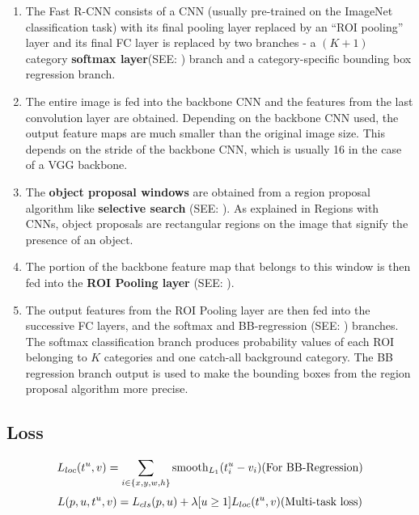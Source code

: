 \begin{enumerate}
    \item The Fast R-CNN consists of a CNN (usually pre-trained on the ImageNet classification task) with its final pooling layer replaced by an “ROI pooling” layer and its final FC layer is replaced by two branches - a $(K + 1)$ category \textbf{softmax layer}(SEE: ) branch and a category-specific bounding box regression branch.

    \item The entire image is fed into the backbone CNN and the features from the last convolution layer are obtained. Depending on the backbone CNN used, the output feature maps are much smaller than the original image size. This depends on the stride of the backbone CNN, which is usually 16 in the case of a VGG backbone.

    \item The \textbf{object proposal windows} are obtained from a region proposal algorithm like \textbf{selective search} (SEE: ). As explained in Regions with CNNs, object proposals are rectangular regions on the image that signify the presence of an object.

    \item The portion of the backbone feature map that belongs to this window is then fed into the \textbf{ROI Pooling layer} (SEE: ).

    \item The output features from the ROI Pooling layer are then fed into the successive FC layers, and the softmax and BB-regression (SEE: ) branches. The softmax classification branch produces probability values of each ROI belonging to $K$ categories and one catch-all background category. The BB regression branch output is used to make the bounding boxes from the region proposal algorithm more precise.
\end{enumerate}

\subsection*{Loss}
\[
    \displaystyle
    L_{loc}(t^u, v) = \sum_{i \in \dCurlyBrac{x,y,w,h}} \operatorname{smooth}_{L_1}(t_i^u - v_i)
    \hfill
    \text{(For BB-Regression)}
\]
\[
    \displaystyle
    L(p,u,t^u,v) = L_{cls}(p,u) + \lambda[u\geq 1]L_{loc}(t^u, v)
    \hfill
    (\text{Multi-task loss})
\]

